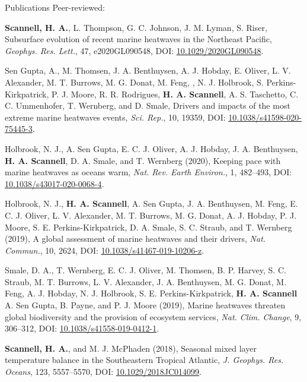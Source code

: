 \documentclass{resume} %
\begin{document}
\begin{rSection}{Publications}
Peer-reviewed:
\begin{etaremune}

\item {{\bf Scannell, H. A.}, L. Thompson, G. C. Johnson, J. M. Lyman, S. Riser, Subsurface evolution of recent marine heatwaves in the Northeast Pacific, \textit{Geophys. Res. Lett.}, 47, e2020GL090548, DOI: \href{https://doi.org/10.1029/2020GL090548}{10.1029/2020GL090548}. }

\item {Sen Gupta, A., M. Thomsen, J. A. Benthuysen, A. J. Hobday, E. Oliver, L. V. Alexander, M. T. Burrows, M. G. Donat, M. Feng, , N. J. Holbrook, S. Perkins-Kirkpatrick, P. J. Moore, R. R. Rodrigues, {\bf H. A. Scannell}, A. S. Taschetto, C. C. Ummenhofer, T. Wernberg, and D. Smale, Drivers and impacts of the most extreme marine heatwaves events, \textit{Sci. Rep.}, 10, 19359, DOI: \href{https://doi.org/10.1038/s41598-020-75445-3}{10.1038/s41598-020-75445-3}.}

\item {Holbrook, N. J., A. Sen Gupta, E. C. J. Oliver, A. J. Hobday, J. A. Benthuysen, {\bf H. A. Scannell}, D. A. Smale, and T. Wernberg (2020), Keeping pace with marine heatwaves as oceans warm, \textit{Nat. Rev. Earth Environ.}, 1, 482–493, DOI: \href{https://doi.org/10.1038/s43017-020-0068-4}{10.1038/s43017-020-0068-4}.}

\item 
{Holbrook, N. J., {\bf H. A. Scannell}, A. Sen Gupta, J. A. Benthuysen, M. Feng, E. C. J. Oliver, L. V. Alexander, M. T. Burrows, M. G. Donat, A. J. Hobday, P. J. Moore, S. E. Perkins-Kirkpatrick, D. A. Smale, S. C. Straub, and T. Wernberg (2019), A global assessment of marine heatwaves and their drivers, \textit{Nat. Commun.}, 10, 2624, DOI: \href{https://doi.org/10.1038/s41467-019-10206-z}{10.1038/s41467-019-10206-z}.}

\item 
{Smale, D. A., T. Wernberg, E. C. J. Oliver, M. Thomsen, B. P. Harvey, S. C. Straub, M. T. Burrows, L. V. Alexander, J. A. Benthuysen, M. G. Donat, M. Feng, A. J. Hobday, N. J. Holbrook, S. E. Perkins-Kirkpatrick, {\bf H. A. Scannell}\, A. Sen Gupta, B. Payne, and P. J. Moore (2019), Marine heatwaves threaten global biodiversity and the provision of ecosystem services, \textit{Nat. Clim. Change}, 9, 306–312, DOI: \href{http://dx.doi.org/10.1038/s41558-019-0412-1}{10.1038/s41558-019-0412-1}.}

\item {{\bf Scannell, H. A.}, and M. J. McPhaden (2018), Seasonal mixed layer temperature balance in the Southeastern Tropical Atlantic, \textit{J. Geophys. Res. Oceans}, 123, 5557–5570, DOI: \href{https://doi.org/10.1029/2018JC014099}{10.1029/2018JC014099}.}


\end{etaremune}
\end{rSection}
\end{document}
